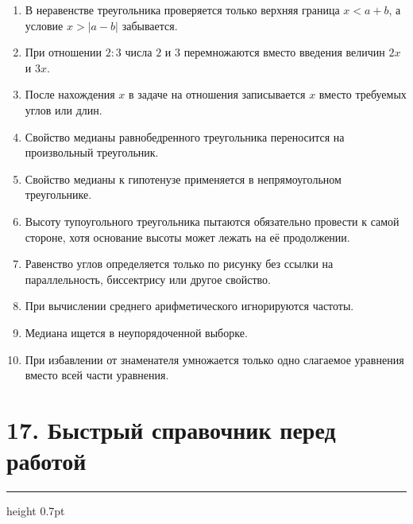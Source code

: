 \documentclass[a4paper,12pt]{article}
\newcommand{\sectionline}{%
    \vspace{-0.15em}
    {\color{accent}\hrule height 0.7pt}
    \vspace{0.55em}
}
\begin{document}
\begin{enumerate}
    \item В неравенстве треугольника проверяется только верхняя граница
    $x<a+b$, а условие $x>|a-b|$ забывается.

    \item При отношении $2:3$ числа $2$ и $3$ перемножаются вместо введения
    величин $2x$ и $3x$.

    \item После нахождения $x$ в задаче на отношения записывается $x$ вместо
    требуемых углов или длин.

    \item Свойство медианы равнобедренного треугольника переносится на
    произвольный треугольник.

    \item Свойство медианы к гипотенузе применяется в непрямоугольном
    треугольнике.

    \item Высоту тупоугольного треугольника пытаются обязательно провести к
    самой стороне, хотя основание высоты может лежать на её продолжении.

    \item Равенство углов определяется только по рисунку без ссылки на
    параллельность, биссектрису или другое свойство.

    \item При вычислении среднего арифметического игнорируются частоты.

    \item Медиана ищется в неупорядоченной выборке.

    \item При избавлении от знаменателя умножается только одно слагаемое
    уравнения вместо всей части уравнения.
\end{enumerate}

\section*{\color{darkaccent}17. Быстрый справочник перед работой}
\sectionline
\end{document}
